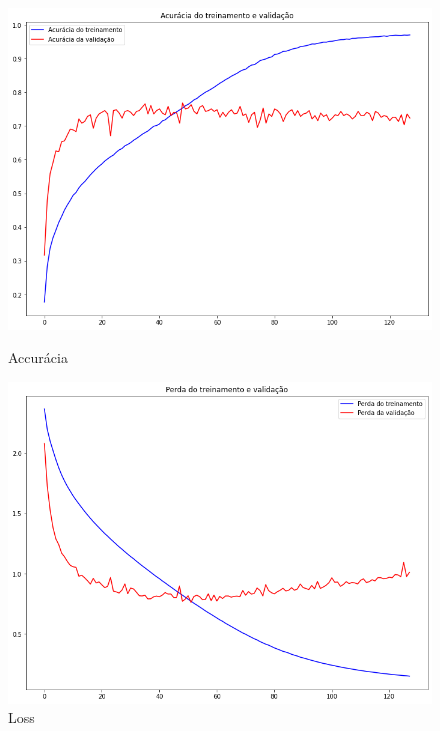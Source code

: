 \documentclass[12pt]{article}
\begin{document}
\begin{figure}[!htb]
  \begin{minipage}{.47\textwidth}
    \centering
    \includegraphics[width=1.1\linewidth]{experiments/lenet5_aug_128/accuracy.png}
    \caption{Accurácia}\label{fig:experiment_lenet5_aug_128_accuracy}
  \end{minipage}\hfill
  \begin{minipage}{.47\textwidth}
    \centering
    \includegraphics[width=1.1\linewidth]{experiments/lenet5_aug_128/loss.png}
    \caption{Loss}\label{fig:experiment_lenet5_aug_128_loss}
  \end{minipage}
\end{figure}
\end{document}
